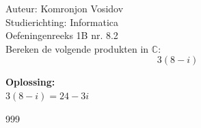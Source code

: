 \documentclass[a4paper]{article}
\begin{document}
	
	\noindent \large Auteur: Komronjon Vosidov \\
	\noindent \large Studierichting: Informatica\\
	\noindent \large Oefeningenreeks 1B nr. 8.2\\
	
	
	
	\normalsize
	Bereken de volgende produkten in $\mathbb{C}$:
	\begin{equation*}
		3(8-i)
	\end{equation*}
	
	
	\textbf{Oplossing:}\\
	
	$3(8-i)=24-3i$ \\	
	
	
	\begin{thebibliography}{999}
		
	\end{thebibliography}	
	
	
\end{document}
